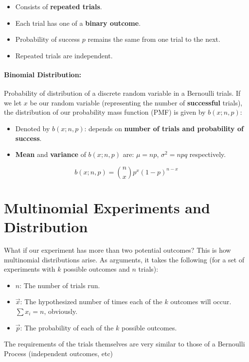 \documentclass[a4paper,12pt]{report}
\begin{document}
\begin{itemize}
\item Consists of \textbf{repeated trials}.
\item Each trial has one of a \textbf{binary outcome}.
\item Probability of success $p$ remains the same from one trial to the next.
\item Repeated trials are independent.
\end{itemize}


\paragraph{Binomial Distribution: } Probability of distribution of a discrete random variable in a Bernoulli trials. If we let $x$ be our random variable (representing the number of \textbf{successful} trials), the distribution of our probability mass function (PMF) is given by $b(x; n, p)$: 

\begin{itemize}
\item Denoted by $b(x; n, p)$: depends on \textbf{number of trials and probability of success}.
\item \textbf{Mean} and \textbf{variance} of $b(x;n,p)$ are: $\mu = np$, $\sigma^2=npq$ respectively.
\end{itemize}

$$b(x; n, p) = \binom nx p^x(1-p)^{n-x}$$

\section{Multinomial Experiments and Distribution}

What if our experiment has more than two potential outcomes? This is how multinomial distributions arise. As arguments, it takes the following (for a set of 
experiments with $k$ possible outcomes and $n$ trials):

\begin{itemize}
\item $n$: The number of trials run.
\item $\vec{x}$: The hypothesized number of times each of the $k$ outcomes will occur. $\sum x_i = n$, obviously.
\item $\vec{p}$: The probability of each of the $k$ possible outcomes. 
\end{itemize}

The requirements of the trials themselves are very similar to those of a Bernoulli Process (independent outcomes, etc)
\end{document}
